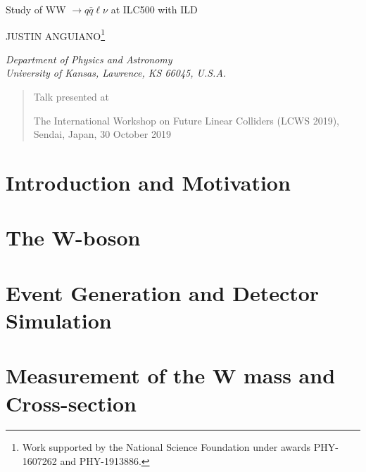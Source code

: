 \documentclass[12pt]{article}
\newcommand\pubnumber{}
\newcommand\pubdate{\today}
\def\kansas{Department of Physics and Astronomy\\
University of Kansas, Lawrence, KS 66045, U.S.A.}
\def\support{\footnote{Work supported by the National Science Foundation  
                       under awards PHY-1607262 and PHY-1913886.}}
\def\Title#1{\begin{center} {\Large #1 } \end{center}}
\def\Author#1{\begin{center}{ \sc #1} \end{center}}
\def\Address#1{\begin{center}{ \it #1} \end{center}}
\newcommand\pubblock{\rightline{\begin{tabular}{l} \pubnumber\\
         \pubdate  \end{tabular}}}
\newenvironment{Abstract}{\begin{quotation}  }{\end{quotation}}
\newenvironment{Presented}{\begin{quotation} \begin{center} 
             Talk presented at \end{center}\bigskip 
      \begin{center}\begin{large}}{\end{large}\end{center} \end{quotation}}
\begin{document}
\begin{titlepage}
\pubblock

\vfill
\Title{Study of WW $\rightarrow q\bar{q}\ell\nu$ at ILC500 with ILD }
\vfill
\Author{JUSTIN ANGUIANO\support}
\Address{\kansas}
\vfill
\begin{Abstract}

\end{Abstract}
\vfill
\begin{Presented}
The International Workshop on Future Linear Colliders (LCWS 2019),\\
Sendai, Japan, 30 October 2019\\
\end{Presented}
\vfill
\end{titlepage}
\def\thefootnote{\fnsymbol{footnote}}
\setcounter{footnote}{0}
%



\section{Introduction and Motivation}
\label{sec:Introduction}

\section{The W-boson}
\label{sec:physics}






\section{Event Generation and Detector Simulation}
\label{sec:ILC_detector}



\section{Measurement of the W mass and Cross-section}
\label{Current_Work} 
\end{document}

